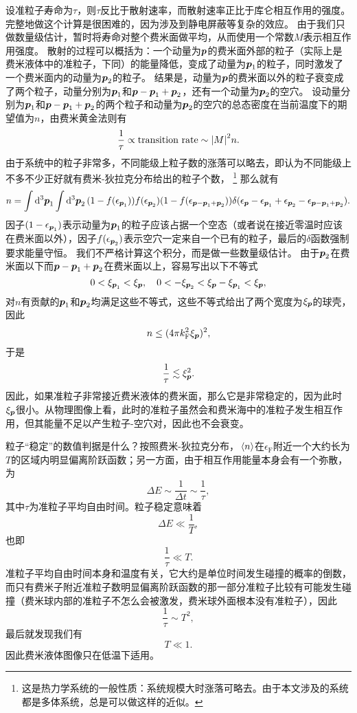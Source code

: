 设准粒子寿命为$\tau$，则$\tau$反比于散射速率，而散射速率正比于库仑相互作用的强度。完整地做这个计算是很困难的，因为涉及到静电屏蔽等复杂的效应。
由于我们只做数量级估计，暂时将寿命对整个费米面做平均，从而使用一个常数$M$表示相互作用强度。
散射的过程可以概括为：一个动量为$\vb*{p}$的费米面外部的粒子（实际上是费米液体中的准粒子，下同）的能量降低，变成了动量为$\vb*{p}_1$的粒子，同时激发了一个费米面内的动量为$\vb*{p}_2$的粒子。
结果是，动量为$\vb*{p}$的费米面以外的粒子衰变成了两个粒子，动量分别为$\vb*{p}_1$和$\vb*{p} - \vb*{p}_1 + \vb*{p}_2$，还有一个动量为$\vb*{p}_2$的空穴。
设动量分别为$\vb*{p}_1$和$\vb*{p} - \vb*{p}_1 + \vb*{p}_2$的两个粒子和动量为$\vb*{p}_2$的空穴的总态密度在当前温度下的期望值为$n$，由费米黄金法则有
\[
    \frac{1}{\tau} \propto \text{transition rate} \sim \abs{M}^2 n.
\]
由于系统中的粒子非常多，不同能级上粒子数的涨落可以略去，即认为不同能级上不多不少正好就有费米-狄拉克分布给出的粒子个数，%
\footnote{这是热力学系统的一般性质：系统规模大时涨落可略去。由于本文涉及的系统都是多体系统，总是可以做这样的近似。}%
那么就有
\[
    n = \int \dd[3]{\vb*{p}_1} \int \dd[3]{\vb*{p}_2} (1 - f(\epsilon_{\vb*{p}_1})) f(\epsilon_{\vb*{p}_2}) (1 - f(\epsilon_{\vb*{p} - \vb*{p}_1 + \vb*{p}_2})) \delta(\epsilon_{\vb*{p}} - \epsilon_{\vb*{p}_1} + \epsilon_{\vb*{p}_2} - \epsilon_{\vb*{p} - \vb*{p}_1 + \vb*{p}_2}).
\]
因子$(1-\epsilon_{\vb*{p}_1})$表示动量为$\vb*{p}_1$的粒子应该占据一个空态（或者说在接近零温时应该在费米面以外），因子$f(\epsilon_{\vb*{p}_2})$表示空穴一定来自一个已有的粒子，最后的$\delta$函数强制要求能量守恒。
我们不严格计算这个积分，而是做一些数量级估计。
由于$\vb*{p}_2$在费米面以下而$\vb*{p}- \vb*{p}_1 + \vb*{p}_2$在费米面以上，容易写出以下不等式
\[
    0 < \xi_{\vb*{p}_1} < \xi_{\vb*{p}}, \quad 0 < - \xi_{\vb*{p}_2} < \xi_{\vb*{p}} - \xi_{\vb*{p}_1} < \xi_{\vb*{p}},
\]
对$n$有贡献的$\vb*{p}_1$和$\vb*{p}_2$均满足这些不等式，这些不等式给出了两个宽度为$\xi_{\vb*{p}}$的球壳，因此
\[
    n \leq (4 \pi k_\text{F}^2 \xi_{\vb*{p}})^2,
\]
于是
\begin{equation}
    \frac{1}{\tau} \lesssim \xi_{\vb*{p}}^2.
\end{equation}
因此，如果准粒子非常接近费米液体的费米面，那么它是非常稳定的，因为此时$\xi_{\vb*{p}}$很小。从物理图像上看，此时的准粒子虽然会和费米海中的准粒子发生相互作用，但其能量不足以产生粒子-空穴对，因此也不会衰变。

粒子“稳定”的数值判据是什么？按照费米-狄拉克分布，$\expval*{{n}}$在$\epsilon_\text{F}$附近一个大约长为$T$的区域内明显偏离阶跃函数；另一方面，由于相互作用能量本身会有一个弥散，为
\[
    \Delta E \sim \frac{1}{\Delta t} \sim \frac{1}{\tau},
\]
其中$\tau$为准粒子平均自由时间。粒子稳定意味着
\[
    \Delta E \ll \frac{1}{T},
\]
也即
\[
    \frac{1}{\tau} \ll T.
\]
准粒子平均自由时间本身和温度有关，它大约是单位时间发生碰撞的概率的倒数，而只有费米子附近准粒子数明显偏离阶跃函数的那一部分准粒子比较有可能发生碰撞（费米球内部的准粒子不怎么会被激发，费米球外面根本没有准粒子），因此
\[
    \frac{1}{\tau} \sim T^2,
\]
最后就发现我们有
\[
    T \ll 1.
\]
因此费米液体图像只在低温下适用。


